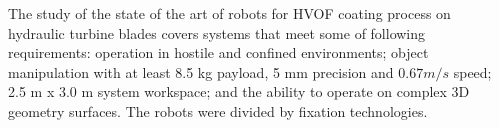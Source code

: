 The study of the state of the art of robots for HVOF coating process on
hydraulic turbine blades covers systems that meet some of following requirements:
operation in hostile and confined environments; object manipulation with
at least 8.5 kg payload, 5 mm precision and $0.67 m/s$ speed; 2.5 m x 3.0 m
system workspace; and the ability to operate on complex 3D geometry surfaces.
The robots were divided by fixation technologies.


